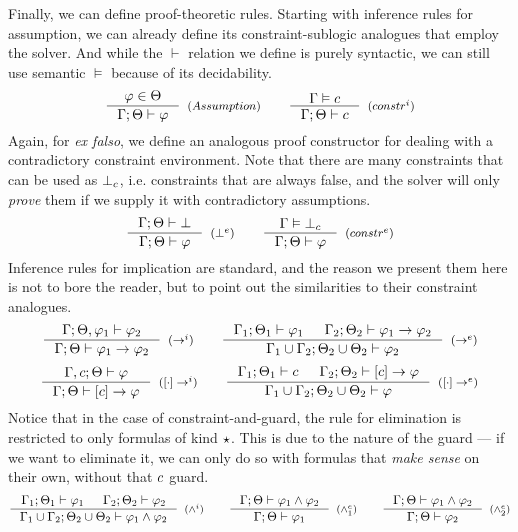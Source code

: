 \documentclass[english, mgr]{iithesis}
\begin{document}
Finally, we can define proof-theoretic rules.
Starting with inference rules for assumption,
we can already define its constraint-sublogic analogues that employ the solver.
And while the $\vdash$ relation we define is purely syntactic,
we can still use semantic $\vDash$ because of its decidability.
$$
  \inference{
    \formphi \in \Theta
  }{
    \jgmnt[\cEnv;\Theta]{\formphi}
  }[(\ensuremath{Assumption})]
  \qquad
  \inference{
    \cjgmnt[\cEnv]{\constr}
  }{
    \jgmnt[\cEnv;\Theta]{\constr}
  }[(\ensuremath{constr^i})]
$$
Again, for \textit{ex falso}, we define an analogous proof constructor for dealing with a contradictory
constraint environment.
Note that there are many constraints that can be used as $\bot_c$, i.e.
constraints that are always false, and the solver will only \textit{prove} them
if we supply it with contradictory assumptions.
$$
  \inference{
    \jgmnt[\cEnv;\Theta]{\bot}
  }{
    \jgmnt[\cEnv;\Theta]{\formphi}
  }[(\ensuremath{\bot^e})]
  \qquad
  \inference{
    \cjgmnt[\cEnv]{\bot_\constr}
    }{
    \jgmnt[\cEnv;\Theta]{\formphi}
  }[(\ensuremath{constr^e})]
$$
Inference rules for implication are standard, and the reason we present them here
is not to bore the reader, but to point out the similarities to their constraint analogues.
$$
  \inference{
    \jgmnt[\cEnv;\Theta,\formphi_1]{\formphi_2}
  }{
    \jgmnt[\cEnv;\Theta]{\formphi_1 \fImp \formphi_2}
  }[(\ensuremath{\fImp^i})]
  \qquad
  \inference{
    \jgmnt[\cEnv_1;\Theta_1]{\formphi_1} &
    \jgmnt[\cEnv_2;\Theta_2]{\formphi_1 \fImp \formphi_2}
    }{
    \jgmnt[\cEnv_1 \cup \cEnv_2;\Theta_2 \cup \Theta_2]{\formphi_2}
  }[(\ensuremath{\fImp^e})]
$$
$$
  \inference{
    \jgmnt[\cEnv, \constr;\Theta]{\formphi}
  }{
    \jgmnt[\cEnv;\Theta]{\fCImp{\constr}\formphi}
  }[(\ensuremath{\fCImp{\cdot}^i})]
  \qquad
  \inference{
    \jgmnt[\cEnv_1;\Theta_1]{\constr} &
    \jgmnt[\cEnv_2;\Theta_2]{\fCImp{\constr}\formphi}
    }{
    \jgmnt[\cEnv_1 \cup \cEnv_2;\Theta_2 \cup \Theta_2]{\formphi}
  }[(\ensuremath{\fCImp{\cdot}^e})]
$$
Notice that in the case of constraint-and-guard, the rule for elimination is restricted
to only formulas of kind $\star$.
This is due to the nature of the guard --- if we want to eliminate it,
we can only do so with formulas that \textit{make sense} on their own,
without that $c$ guard.
$$
  \inference{
    \jgmnt[\cEnv_1;\Theta_1]{\formphi_1} &
    \jgmnt[\cEnv_2;\Theta_2]{\formphi_2}
  }{
    \jgmnt[\cEnv_1 \cup \cEnv_2;\Theta_2 \cup \Theta_2]{\formphi_1 \wedge \formphi_2}
  }[(\ensuremath{\wedge^i})]
  \qquad
  \inference{
    \jgmnt[\cEnv;\Theta]{\formphi_1 \wedge \formphi_2}
    }{
    \jgmnt[\cEnv;\Theta]{\formphi_1}
  }[(\ensuremath{\wedge^e_1})]\qquad
  \inference{
    \jgmnt[\cEnv;\Theta]{\formphi_1 \wedge \formphi_2}
    }{
    \jgmnt[\cEnv;\Theta]{\formphi_2}
  }[(\ensuremath{\wedge^e_2})]
$$
\end{document}
